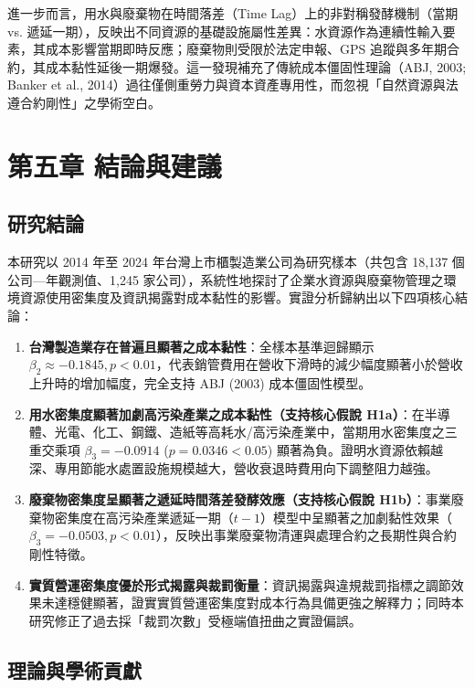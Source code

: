 \documentclass[12pt,a4paper]{article}
\begin{document}
進一步而言，用水與廢棄物在時間落差（Time Lag）上的非對稱發酵機制（當期 vs. 遞延一期），反映出不同資源的基礎設施屬性差異：水資源作為連續性輸入要素，其成本影響當期即時反應；廢棄物則受限於法定申報、GPS 追蹤與多年期合約，其成本黏性延後一期爆發。這一發現補充了傳統成本僵固性理論（ABJ, 2003; Banker et al., 2014）過往僅側重勞力與資本資產專用性，而忽視「自然資源與法遵合約剛性」之學術空白。

\newpage

\section{第五章 結論與建議}

\subsection{研究結論}

本研究以 2014 年至 2024 年台灣上市櫃製造業公司為研究樣本（共包含 18,137 個公司—年觀測值、1,245 家公司），系統性地探討了企業水資源與廢棄物管理之環境資源使用密集度及資訊揭露對成本黏性的影響。實證分析歸納出以下四項核心結論：

\begin{enumerate}[leftmargin=*]
    \item \textbf{台灣製造業存在普遍且顯著之成本黏性}：全樣本基準迴歸顯示 $\beta_2 \approx -0.1845, p < 0.01$，代表銷管費用在營收下滑時的減少幅度顯著小於營收上升時的增加幅度，完全支持 ABJ (2003) 成本僵固性模型。
    \item \textbf{用水密集度顯著加劇高污染產業之成本黏性（支持核心假說 H1a）}：在半導體、光電、化工、鋼鐵、造紙等高耗水/高污染產業中，當期用水密集度之三重交乘項 $\beta_3 = -0.0914$ ($p = 0.0346 < 0.05$) 顯著為負。證明水資源依賴越深、專用節能水處置設施規模越大，營收衰退時費用向下調整阻力越強。
    \item \textbf{廢棄物密集度呈顯著之遞延時間落差發酵效應（支持核心假說 H1b）}：事業廢棄物密集度在高污染產業遞延一期（$t-1$）模型中呈顯著之加劇黏性效果（$\beta_3 = -0.0503, p < 0.01$），反映出事業廢棄物清運與處理合約之長期性與合約剛性特徵。
    \item \textbf{實質營運密集度優於形式揭露與裁罰衡量}：資訊揭露與違規裁罰指標之調節效果未達穩健顯著，證實實質營運密集度對成本行為具備更強之解釋力；同時本研究修正了過去採「裁罰次數」受極端值扭曲之實證偏誤。
\end{enumerate}

\subsection{理論與學術貢獻}
\end{document}

